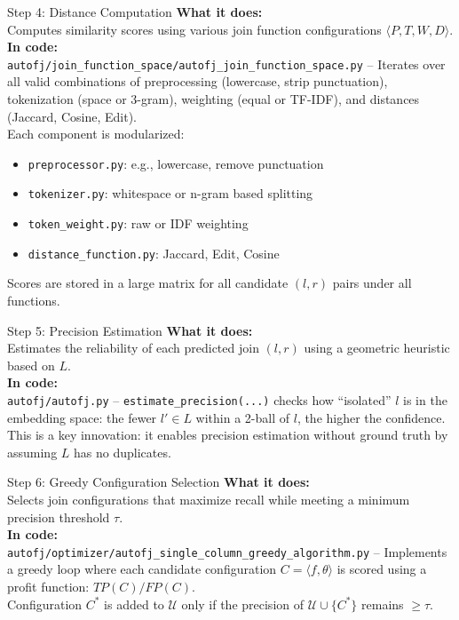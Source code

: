 \documentclass[8pt]{beamer} %
\begin{document}
\begin{frame}{Step 4: Distance Computation}
	\textbf{What it does:} \\
	Computes similarity scores using various join function configurations $\langle P, T, W, D \rangle$. \\[1ex]
	\textbf{In code:} \\
	\texttt{autofj/join\_function\_space/autofj\_join\_function\_space.py} – Iterates over all valid combinations of preprocessing (lowercase, strip punctuation), tokenization (space or 3-gram), weighting (equal or TF-IDF), and distances (Jaccard, Cosine, Edit). \\
	Each component is modularized:
	\begin{itemize}
		\item \texttt{preprocessor.py}: e.g., lowercase, remove punctuation
		\item \texttt{tokenizer.py}: whitespace or n-gram based splitting
		\item \texttt{token\_weight.py}: raw or IDF weighting
		\item \texttt{distance\_function.py}: Jaccard, Edit, Cosine
	\end{itemize}
	Scores are stored in a large matrix for all candidate $(l, r)$ pairs under all functions.
\end{frame}

\begin{frame}{Step 5: Precision Estimation}
	\textbf{What it does:} \\
	Estimates the reliability of each predicted join $(l, r)$ using a geometric heuristic based on $L$. \\[1ex]
	\textbf{In code:} \\
	\texttt{autofj/autofj.py} – \texttt{estimate\_precision(...)} checks how ``isolated'' $l$ is in the embedding space: the fewer $l' \in L$ within a 2-ball of $l$, the higher the confidence. \\
	This is a key innovation: it enables precision estimation without ground truth by assuming $L$ has no duplicates.
\end{frame}

\begin{frame}{Step 6: Greedy Configuration Selection}
	\textbf{What it does:} \\
	Selects join configurations that maximize recall while meeting a minimum precision threshold $\tau$. \\[1ex]
	\textbf{In code:} \\
	\texttt{autofj/optimizer/autofj\_single\_column\_greedy\_algorithm.py} – Implements a greedy loop where each candidate configuration $C = \langle f, \theta \rangle$ is scored using a profit function: $TP(C) / FP(C)$. \\
	Configuration $C^*$ is added to $\mathcal{U}$ only if the precision of $\mathcal{U} \cup \{C^*\}$ remains $\geq \tau$.
\end{frame}
\end{document}
